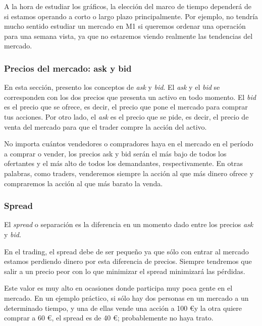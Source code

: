 A la hora de estudiar los gráficos, la elección del marco de tiempo dependerá de si estamos operando a corto o largo plazo principalmente. Por ejemplo, no tendría mucho sentido estudiar un mercado en M1 si queremos ordenar una operación para una semana vista, ya que no estaremos viendo realmente las tendencias del mercado. \newline



\subsubsection{Precios del mercado: ask y bid}

En esta sección, presento los conceptos de \textit{ask} y \textit{bid}. El \textit{ask} y el \textit{bid} se corresponden con los dos precios que presenta un activo en todo momento. El \textit{bid} es el precio que se ofrece, es decir, el precio que pone el mercado para comprar tus acciones. Por otro lado, el \textit{ask} es el precio que se pide, es decir, el precio de venta del mercado para que el trader compre la acción del activo.  \newline

No importa cuántos vendedores o compradores haya en el mercado en el período a comprar o vender, los precios ask y bid serán el más bajo de todos los ofertantes y el más alto de todos los demandantes, respectivamente. En otras palabras, como traders, venderemos siempre la acción al que más dinero ofrece y compraremos la acción al que más barato la venda. \newline

\subsubsection{Spread}

El \textit{spread} o separación es la diferencia en un momento dado entre los precios \textit{ask} y \textit{bid}. \newline

En el trading, el spread debe de ser pequeño ya que sólo con entrar al mercado estamos perdiendo dinero por esta diferencia de precios. Siempre tendremos que salir a un precio peor con lo que minimizar el spread minimizará las pérdidas. \newline

Este valor es muy alto en ocasiones donde participa muy poca gente en el mercado. En un ejemplo práctico, si sólo hay dos personas en un mercado a un determinado tiempo, y una de ellas vende una acción a 100 \euro y la otra quiere comprar a 60 \euro, el spread es de 40 \euro; probablemente no haya trato. \newline

